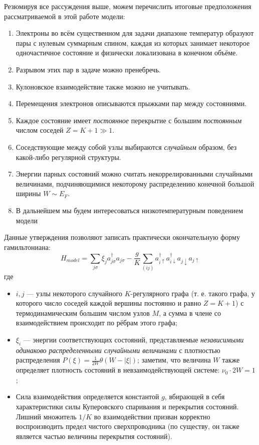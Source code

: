 Резюмируя все рассуждения выше, можем перечислить итоговые предположения рассматриваемой в этой работе модели:
\begin{enumerate}
	\item Электроны во всём существенном для задачи диапазоне температур образуют пары с нулевым суммарным спином, каждая из которых занимает некоторое одночастичное состояние и физически локализована в конечном объёме.
	\item Разрывом этих пар в задаче можно пренебречь.
	\item Кулоновское взаимодействие также можно не учитывать.
	\item Перемещения электронов описываются прыжками пар между состояниями.
	\item Каждое состояние имеет \textit{постоянное} перекрытие с большим \textit{постоянным} числом соседей $Z = K + 1 \gg 1$.
	\item Соседствующие между собой узлы выбираются \textit{случайным} образом, без какой-либо регулярной структуры.
	\item Энергии парных состояний можно считать некоррелированными случайными величинами, подчиняющимися некоторому распределению конечной большой ширины $W \sim E_F$.
	\item В дальнейшем мы будем интересоваться низкотемпературным поведением модели
\end{enumerate}
Данные утверждения позволяют записать практически окончательную форму гамильтониана:
\begin{equation}
\label{eq:Ham_physical}
H_{model} = \sum_{j\sigma} \xi_j a_{j\sigma}^\dagger a_{j\sigma} - \frac{g}{K} \sum_{(ij)} a_{i\uparrow}^\dagger a_{i\downarrow}^\dagger a_{j\downarrow} a_{j\uparrow}
\end{equation}
где
\begin{itemize}
	\item $i,j$ --- узлы некоторого случайного $K$-регулярного графа (т. е. такого графа, у которого число соседей каждой вершины постоянно и равно $Z = K + 1$) с термодинамическим большим числом узлов $M$, а сумма в члене со взаимодействием происходит по рёбрам этого графа;
	\item $\xi_i$ --- энергии соответствующих состояний, представляемые \textit{независимыми одинаково распределенными случайными величинами} с плотностью распределения $P(\xi) = \frac{1}{2 W}\theta(W - |\xi|)$; заметим, что величина $W$ также определяет плотность состояний в невзаимодействующей системе: $\nu_0 \cdot 2 W = 1$;
	\item Сила взаимодействия определяется константой $g$, вбирающей в себя характеристики силы Куперовского спаривания и перекрытия состояний. Лишний множитель $1/K$ во взаимодействии призван корректно воспроизводить предел чистого сверхпроводника (по существу, он также является частью величины перекрытия состояний).
\end{itemize} 

